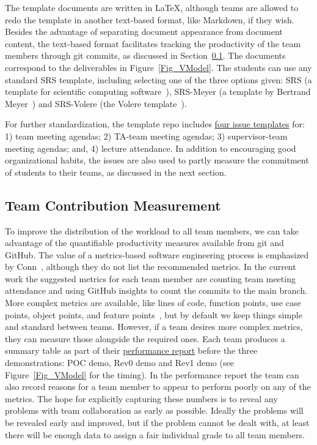\documentclass[10pt, conference]{IEEEtran}
\begin{document}
The template documents are written in \LaTeX, although teams are allowed to redo
the template in another text-based format, like Markdown, if they wish. Besides
the advantage of separating document appearance from document content, the
text-based format facilitates tracking the productivity of the team members
through git commits, as discussed in Section~\ref{Sec_TeamContribMeasure}. The
documents correspond to the deliverables in Figure~\ref{Fig_VModel}. The
students can use any standard SRS template, including selecting one of the three
options given: SRS (a template for scientific computing
software~\cite{SmithAndLai2005}), SRS-Meyer (a template by Bertrand
Meyer~\cite{Meyer2022}) and SRS-Volere (the Volere
template~\cite{RobertsonAndRobertson1999Vol}).

For further standardization, the template repo includes
\href{Redact link}
{four issue templates} for: 1) team meeting agendas; 2) TA-team meeting agendas;
3) supervisor-team meeting agendas; and, 4) lecture attendance.  In addition to
encouraging good organizational habits, the issues are also used to partly
measure the commitment of students to their teams, as discussed in the next
section.

\subsection{Team Contribution Measurement} \label{Sec_TeamContribMeasure}

To improve the distribution of the workload to all team members, we can take
advantage of the quantifiable productivity measures available from git and
GitHub.  The value of a metrics-based software engineering process is emphasized
by Conn~\cite{connReusableAcademicstrengthMetricsbased2004}, although they do
not list the recommended metrics.  In the current work the suggested metrics for
each team member are counting team meeting attendance and using GitHub insights
to count the commits to the main branch.  More complex metrics are available,
like lines of code, function points, use case points, object points, and feature
points~\cite{sudhakarMeasuringProductivitySoftware2012}, but by default we keep
things simple and standard between teams.  However, if a team desires more
complex metrics, they can measure those alongside the required ones. Each team
produces a summary table as part of their \href{REDACT LINK}  
{performance report} before the three demonstrations: POC demo, Rev0 demo and
Rev1 demo (see Figure~\ref{Fig_VModel} for the timing). In the performance
report the team can also record reasons for a team member to appear to perform
poorly on any of the metrics. The hope for explicitly capturing these numbers
is to reveal any problems with team collaboration as early as possible.  Ideally the problems will be
revealed early and improved, but if the problem cannot be dealt with, at least
there will be enough data to assign a fair individual grade to all team members.
\end{document}
